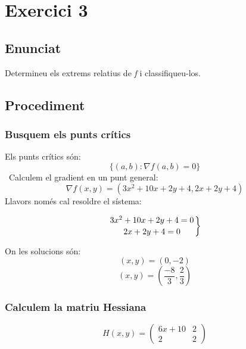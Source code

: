 \documentclass[12pt]{report}
\begin{document}
\chapter{Exercici 3}
\section{Enunciat}
Determineu els extrems relatius de \textit{f} i classifiqueu-los.

\section{Procediment}

\subsection{Busquem els punts crítics}
Els punts crítics són:
\[ \{(a,b) : \nabla f(a,b) = 0\} \]\
Calculem el gradient en un punt general:
\[  \nabla f(x,y) = (3x^2+10x+2y+4, 2x+2y+4) \]
Llavors només cal resoldre el sístema:

\begin{equation*}
    \left.
    3x^2+10x+2y+4=0 \atop
    2x+2y+4=0 \right\}
\end{equation*}

On les solucions són:
\[(x,y) = (0,-2) \]
\[(x,y) = \left(\frac{-8}{3},\frac{2}{3}\right) \]
 
 
\subsection{Calculem la matriu Hessiana}


\[H(x,y) =
\begin{pmatrix}
    6x+10 & 2 \\
    2 & 2
\end{pmatrix} 
\]
\end{document}
